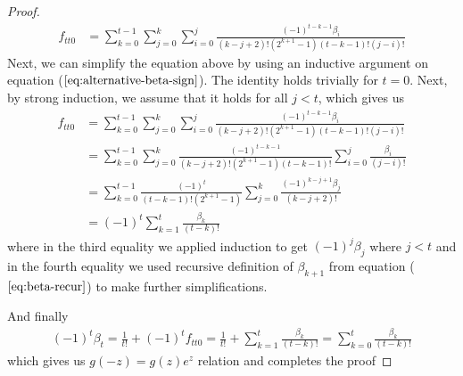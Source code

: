 \documentclass{article}
\begin{document}
\begin{proof}
\begin{align*}
f_{tt0}
&=
  \sum_{k=0}^{t-1}
    \sum_{j=0}^{k}
      \sum_{i=0}^{j}
        \frac{(-1)^{t-k-1} \beta_{i}}
             {(k-j+2)!(2^{k+1}-1)(t-k-1)!(j-i)!}
\end{align*}
Next, we can simplify the equation above by using an inductive argument on equation ($\ref{eq:alternative-beta-sign}$). The identity holds trivially for $t=0$. Next, by strong induction, we assume that it holds for all $j < t$, which gives us
\begin{align*}
f_{tt0}
&=
  \sum_{k=0}^{t-1}
    \sum_{j=0}^{k}
      \sum_{i=0}^{j}
        \frac{(-1)^{t-k-1} \beta_{i}}
             {(k-j+2)!(2^{k+1}-1)(t-k-1)!(j-i)!} \\
&=
  \sum_{k=0}^{t-1}
    \sum_{j=0}^{k}
      \frac{(-1)^{t-k-1}}
           {(k-j+2)!(2^{k+1}-1)(t-k-1)!}
      \sum_{i=0}^{j}
        \frac{\beta_{i}}{(j-i)!} \\
&=
  \sum_{k=0}^{t-1}
    \frac{(-1)^{t}}
         {(t-k-1)!(2^{k+1}-1)}
    \sum_{j=0}^{k}
      \frac{(-1)^{k-j+1} \beta_{j}}
           {(k-j+2)!} \\
&=
  (-1)^t
  \sum_{k=1}^{t}
    \frac{\beta_{k}}
         {(t-k)!}
\end{align*}
where in the third equality we applied induction to get $(-1)^j\beta_j$ where $j < t$ and in the fourth equality we used recursive definition of $\beta_{k+1}$ from equation ($\ref{eq:beta-recur}$) to make further simplifications.

And finally
\begin{align*}
(-1)^t \beta_t
= \frac{1}{t!} + (-1)^t f_{tt0}
= \frac{1}{t!} + \sum_{k=1}^{t} \frac{\beta_{k}}{(t-k)!}
= \sum_{k=0}^{t} \frac{\beta_{k}}{(t-k)!}
\end{align*}
which gives us $g(-z)=g(z)e^z$ relation and completes the proof
\end{proof}
\end{document}
